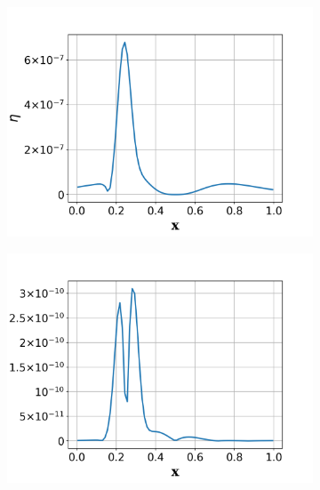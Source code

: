 \documentclass[a4paper]{article}
\begin{document}
\begin{figure}[!htbp]
  \centering
  \centering
  \begin{subfigure}{0.325\textwidth}
    \centering
    \includegraphics[width=1.0\linewidth]{figures/elem_J2error_indicator_p1.png}
    \label{fig:subsonic_J2_eta_p1}
  \end{subfigure}
  \begin{subfigure}{0.325\textwidth}
    \centering
    \includegraphics[width=1.0\linewidth]{figures/elem_J2error_indicator_p2.png}
    \label{fig:subsonic_J2_eta_p2}
  \end{subfigure}
  \begin{subfigure}{0.325\textwidth}

\end{subfigure}
\end{figure}
\end{document}
